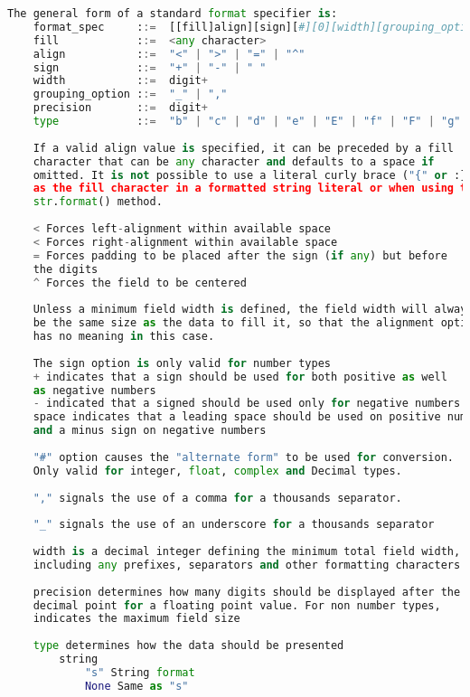 \documentclass[a4paper,landscape]{report}
\begin{document}
\begin{lstlisting}[language=Python]
    The general form of a standard format specifier is:
    format_spec     ::=  [[fill]align][sign][#][0][width][grouping_option][.precision][type]
    fill            ::=  <any character>
    align           ::=  "<" | ">" | "=" | "^"
    sign            ::=  "+" | "-" | " "
    width           ::=  digit+
    grouping_option ::=  "_" | ","
    precision       ::=  digit+
    type            ::=  "b" | "c" | "d" | "e" | "E" | "f" | "F" | "g" | "G" | "n" | "o" | "s" | "x" | "X" | "%"
    
    If a valid align value is specified, it can be preceded by a fill
    character that can be any character and defaults to a space if
    omitted. It is not possible to use a literal curly brace ("{" or :}")
    as the fill character in a formatted string literal or when using the
    str.format() method.
    
    < Forces left-alignment within available space
    < Forces right-alignment within available space
    = Forces padding to be placed after the sign (if any) but before
    the digits
    ^ Forces the field to be centered
    
    Unless a minimum field width is defined, the field width will always
    be the same size as the data to fill it, so that the alignment option
    has no meaning in this case.
    
    The sign option is only valid for number types
    + indicates that a sign should be used for both positive as well
    as negative numbers
    - indicated that a signed should be used only for negative numbers
    space indicates that a leading space should be used on positive numbers,
    and a minus sign on negative numbers
    
    "#" option causes the "alternate form" to be used for conversion.
    Only valid for integer, float, complex and Decimal types.
    
    "," signals the use of a comma for a thousands separator.
    
    "_" signals the use of an underscore for a thousands separator
    
    width is a decimal integer defining the minimum total field width,
    including any prefixes, separators and other formatting characters
    
    precision determines how many digits should be displayed after the 
    decimal point for a floating point value. For non number types,
    indicates the maximum field size
    
    type determines how the data should be presented
        string
            "s" String format
            None Same as "s"
        

\end{lstlisting}
\end{document}
